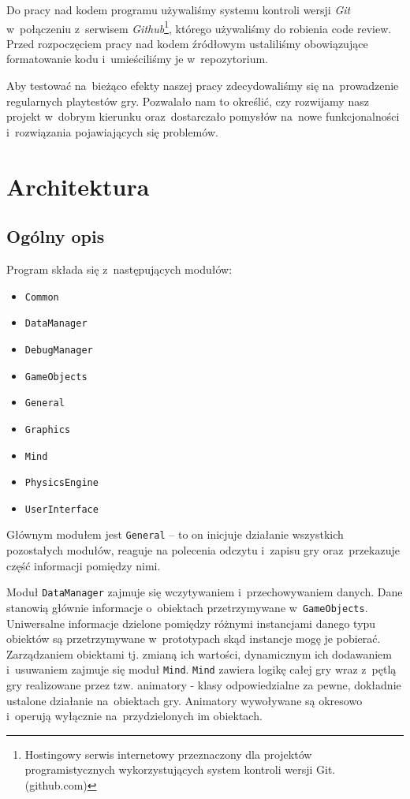 \documentclass[licencjacka]{pracamgr}
\begin{document}
    Do pracy nad kodem programu używaliśmy systemu kontroli wersji \emph{Git} w~połączeniu z~serwisem \emph{Github}\footnote{Hostingowy
    serwis internetowy przeznaczony dla projektów programistycznych wykorzystujących system kontroli wersji Git. (github.com)}, którego używaliśmy
    do robienia code review. Przed rozpoczęciem pracy nad kodem źródłowym ustaliliśmy obowiązujące formatowanie kodu i~umieściliśmy je w~repozytorium.

    Aby testować na~bieżąco efekty naszej pracy zdecydowaliśmy się na~prowadzenie regularnych playtestów gry. Pozwalało nam to określić,
    czy rozwijamy nasz projekt w~dobrym kierunku oraz~dostarczało pomysłów na~nowe funkcjonalności i~rozwiązania pojawiających się problemów.

\chapter{Architektura}
  \section{Ogólny opis}
    Program składa się z~następujących modułów:
    \begin{itemize}
      \item \texttt{Common}
      \item \texttt{DataManager}
      \item \texttt{DebugManager}
      \item \texttt{GameObjects}
      \item \texttt{General}
      \item \texttt{Graphics}
      \item \texttt{Mind}
      \item \texttt{PhysicsEngine}
      \item \texttt{UserInterface}
    \end{itemize}

    Głównym modułem jest \texttt{General} -- to on inicjuje działanie wszystkich pozostałych modułów, reaguje na
    polecenia odczytu i~zapisu gry oraz~przekazuje część informacji pomiędzy nimi.

    Moduł \texttt{DataManager} zajmuje się wczytywaniem i~przechowywaniem danych. Dane stanowią głównie informacje
    o~obiektach przetrzymywane w~\texttt{GameObjects}. Uniwersalne informacje dzielone pomiędzy różnymi instancjami danego
    typu obiektów są przetrzymywane w~prototypach skąd instancje mogę je pobierać. Zarządzaniem obiektami tj. zmianą ich wartości,
    dynamicznym ich dodawaniem i~usuwaniem zajmuje się moduł \texttt{Mind}. \texttt{Mind} zawiera logikę całej gry wraz z~pętlą gry
    realizowane przez tzw. animatory - klasy odpowiedzialne za pewne, dokładnie ustalone działanie na~obiektach gry.
    Animatory wywoływane są okresowo i~operują wyłącznie na~przydzielonych im obiektach.
\end{document}
